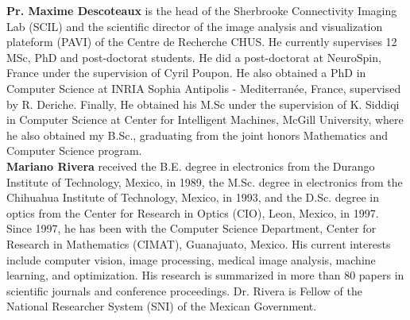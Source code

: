 \documentclass[authoryear,preprint,review,9pt]{elsarticle}
\begin{document}
\textbf{Pr. Maxime Descoteaux} is the head of the Sherbrooke Connectivity Imaging Lab (SCIL) and the scientific director of the image analysis and visualization plateform (PAVI) of the Centre de Recherche CHUS. He currently supervises 12 MSc, PhD and post-doctorat students. He did a post-doctorat at NeuroSpin, France under the supervision of Cyril Poupon. He also obtained a PhD in Computer Science at INRIA Sophia Antipolis - Mediterranée, France, supervised by R. Deriche. Finally, He obtained his M.Sc under the supervision of K. Siddiqi in Computer Science at Center for Intelligent Machines, McGill University, where he also obtained my B.Sc., graduating from the joint honors Mathematics and Computer Science program.\\

\textbf{Mariano Rivera} received the B.E. degree in electronics from the Durango Institute of Technology, Mexico, in 1989, the M.Sc. degree in electronics from the Chihuahua Institute of Technology, Mexico, in 1993, and the D.Sc. degree in optics from the Center for Research in Optics (CIO), Leon, Mexico, in 1997. Since 1997, he has been with the Computer Science Department, Center for Research in Mathematics (CIMAT), Guanajuato, Mexico. His current interests include computer vision, image processing, medical image analysis, machine learning, and optimization. His research is summarized in more than 80 papers in scientific journals and conference proceedings. Dr. Rivera is Fellow of the National Researcher System (SNI) of the Mexican Government.
\end{document}
